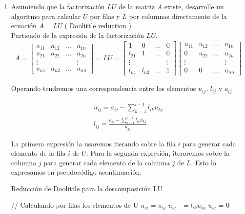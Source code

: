 \documentclass{article}
\begin{document}
\begin{enumerate}
\item Asumiendo que la factorizaci\'on $LU$ de la matriz $A$ existe, desarrolle un algoritmo para calcular $U$ por filas y $L$ por columnas directamente de la ecuaci\'on $A = LU$ ( Doolittle reduction )
\\
Partiendo de la expresi\'on de la factorizaci\'on $LU$.
\begin{gather*}
A = 
	\begin{bmatrix}
		a_{11} & a_{12} & \hdots & a_{1n} \\
		a_{21} & a_{22} & \hdots & a_{2n} \\
		\vdots &&& \vdots \\
		a_{n1} & a_{n2} & \hdots & a_{nn}
	\end{bmatrix}
= 
LU
=
	\begin{bmatrix}
		   1   &    0   & \hdots &   0    \\
		l_{21} &    1   & \hdots &   0    \\
		\vdots &&& \vdots \\
		l_{n1} & l_{n2} & \hdots &   1
	\end{bmatrix}
	\begin{bmatrix}
		u_{11} & u_{12} & \hdots & u_{1n} \\
		   0   & u_{22} & \hdots & u_{2n} \\
		\vdots &&& \vdots \\
		   0   &    0   & \hdots & u_{nn}
	\end{bmatrix}	
\end{gather*}

Operando tendremos una correspondencia entre los elementos $u_{ij}$, $l_{ij}$ y $a_{ij}$.

\begin{gather*}
u_{ij} = a_{ij} - \sum_{k=1}^{i-1}l_{ik}u_{kj} \\
l_{ij} = \frac{a_{ij} - \sum_{k=1}^{j-1}l_{ik}u_{kj}}{u_{jj}}
\end{gather*}

La primera expresi\'on la usaremos iterando sobre la fila $i$ para generar cada elemento de la fila $i$ de $U$. Para la segunda expresi\'on, iteraremos sobre la columna $j$ para generar cada elemento de la columna $j$ de $L$. Esto lo expresamos en pseudoc\'odigo acontinuaci\'on.
\begin{algorithm}[H]
\caption{Reducci\'on de Doolittle para la descomposici\'on LU}
\begin{algorithmic}
		\State // Calculando por filas los elementos de U
			\State $u_{ij}$ = $a_{ij}$
				\State $u_{ij} -= l_{ik} u_{kj}$
			\EndFor
		\Else
			\State $u_{ij}$ = 0
		\EndIf
		

\end{algorithmic}
\end{algorithm}
\end{enumerate}
\end{document}

